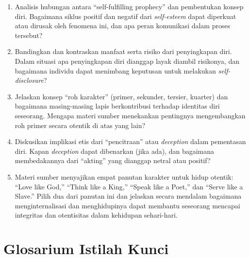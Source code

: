\documentclass[
  letterpaper,
  DIV=11,
  numbers=noendperiod]{scrreprt}
\providecommand{\tightlist}{%
  \setlength{\itemsep}{0pt}\setlength{\parskip}{0pt}}
\begin{document}
\begin{enumerate}
\def\labelenumi{\arabic{enumi}.}
\tightlist
\item
  Analisis hubungan antara ``self-fulfilling prophecy'' dan pembentukan
  konsep diri. Bagaimana siklus positif dan negatif dari
  \emph{self-esteem} dapat diperkuat atau dirusak oleh fenomena ini, dan
  apa peran komunikasi dalam proses tersebut?
\item
  Bandingkan dan kontraskan manfaat serta risiko dari penyingkapan diri.
  Dalam situasi apa penyingkapan diri dianggap layak diambil risikonya,
  dan bagaimana individu dapat menimbang keputusan untuk melakukan
  \emph{self-disclosure}?
\item
  Jelaskan konsep ``roh karakter'' (primer, sekunder, tersier, kuarter)
  dan bagaimana masing-masing lapis berkontribusi terhadap identitas
  diri seseorang. Mengapa materi sumber menekankan pentingnya
  mengembangkan roh primer secara otentik di atas yang lain?
\item
  Diskusikan implikasi etis dari ``pencitraan'' atau \emph{deception}
  dalam pementasan diri. Kapan \emph{deception} dapat dibenarkan (jika
  ada), dan bagaimana membedakannya dari ``akting'' yang dianggap netral
  atau positif?
\item
  Materi sumber menyajikan empat panutan karakter untuk hidup otentik:
  ``Love like God,'' ``Think like a King,'' ``Speak like a Poet,'' dan
  ``Serve like a Slave.'' Pilih dua dari panutan ini dan jelaskan secara
  mendalam bagaimana menginternalisasi dan menghidupinya dapat membantu
  seseorang mencapai integritas dan otentisitas dalam kehidupan
  sehari-hari.
\end{enumerate}


\chapter{Glosarium Istilah Kunci}\label{glosarium-istilah-kunci-1}
\end{document}
